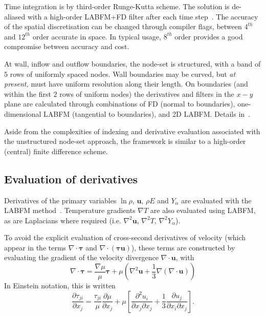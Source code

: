 \documentclass[notitlepage]{revtex4-1}
\begin{document}
Time integration is by third-order Runge-Kutta scheme. The solution is de-aliased with a high-order LABFM+FD filter after each time step~\cite{king_labfm_2022}. The accuracy of the spatial discretisation can be changed through compiler flags, between $4^{th}$ and $12^{th}$ order accurate in space. In typical usage, $8^{th}$ order provides a good compromise between accuracy and cost.

At wall, inflow and outflow boundaries, the node-set is structured, with a band of $5$ rows of uniformly spaced nodes. Wall boundaries may be curved, but \emph{at present,} must have uniform resolution along their length. On boundaries (and within the first $2$ rows of uniform nodes) the derivatives and filters in the $x-y$ plane are calculated through combinations of FD (normal to boundaries), one-dimensional LABFM (tangential to boundaries), and 2D LABFM. Details in~\cite{king_labfm_2022}.

Aside from the complexities of indexing and derivative evaluation associated with the unstructured node-set approach, the framework is similar to a high-order (central) finite difference scheme.

\subsection{Evaluation of derivatives}

Derivatives of the primary variables $\ln\rho$, $\bm{u}$, $\rho{E}$ and $Y_{\alpha}$ are evaluated with the LABFM method~\cite{king_labfm_2022}. Temperature gradients $\nabla{T}$ are also evaluated using LABFM, as are Laplacians where required (i.e. $\nabla^{2}\bm{u}$, $\nabla^{2}{T}$, $\nabla^{2}Y_{\alpha}$). 

To avoid the explicit evaluation of cross-second derivatives of velocity (which appear in the terms $\nabla\cdot\bm{\tau}$ and $\nabla\cdot\left(\bm{\tau}\bm{u}\right)$), these terms are constructed by evaluating the gradient of the velocity divergence $\nabla\cdot\bm{u}$, with
\begin{equation}\nabla\cdot\bm{\tau}=\frac{\nabla\mu}{\mu}\bm{\tau}+\mu\left(\nabla^{2}\bm{u}+\frac{1}{3}\nabla\left(\nabla\cdot\bm{u}\right)\right)\label{eq:divtau}\end{equation}
In Einstein notation, this is written
\begin{equation}\frac{\partial\tau_{ji}}{\partial{x}_{j}}=\frac{\tau_{ji}}{\mu}\frac{\partial\mu}{\partial{x}_{j}}+\mu\left[\frac{\partial^{2}u_{i}}{\partial{x}_{j}\partial{x}_{j}}+\frac{1}{3}\frac{\partial{u}_{j}}{\partial{x}_{i}\partial{x}_{j}}\right].\end{equation}
\end{document}
